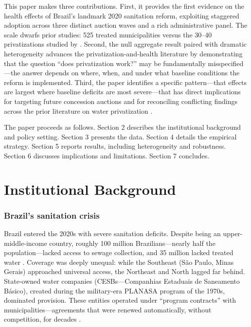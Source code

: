 \documentclass[12pt]{article}
\begin{document}
This paper makes three contributions. First, it provides the first evidence on the health effects of Brazil's landmark 2020 sanitation reform, exploiting staggered adoption across three distinct auction waves and a rich administrative panel. The scale dwarfs prior studies: 525 treated municipalities versus the 30--40 privatizations studied by \citet{galiani2005water}. Second, the null aggregate result paired with dramatic heterogeneity advances the privatization-and-health literature by demonstrating that the question ``does privatization work?'' may be fundamentally misspecified---the answer depends on where, when, and under what baseline conditions the reform is implemented. Third, the paper identifies a specific pattern---that effects are largest where baseline deficits are most severe---that has direct implications for targeting future concession auctions and for reconciling conflicting findings across the prior literature on water privatization \citep{galiani2005water, davis2008privatization, estache2005infrastructure}.

The paper proceeds as follows. Section 2 describes the institutional background and policy setting. Section 3 presents the data. Section 4 details the empirical strategy. Section 5 reports results, including heterogeneity and robustness. Section 6 discusses implications and limitations. Section 7 concludes.


\section{Institutional Background}

\subsubsection*{Brazil's sanitation crisis} Brazil entered the 2020s with severe sanitation deficits. Despite being an upper-middle-income country, roughly 100 million Brazilians---nearly half the population---lacked access to sewage collection, and 35 million lacked treated water \citep{snis2020}. Coverage was deeply unequal: while the Southeast (S\~{a}o Paulo, Minas Gerais) approached universal access, the Northeast and North lagged far behind. State-owned water companies (CESBs---Companhias Estaduais de Saneamento B\'{a}sico), created during the military-era PLANASA program of the 1970s, dominated provision. These entities operated under ``program contracts'' with municipalities---agreements that were renewed automatically, without competition, for decades \citep{turolla2002brazilian}.
\end{document}
